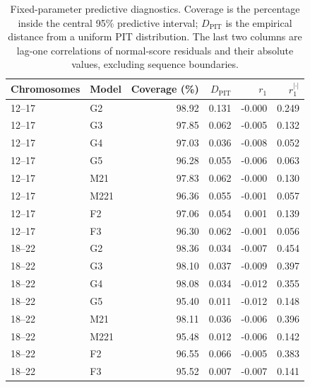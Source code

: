 \begin{table}[htbp]
\centering
\small
\caption{Fixed-parameter predictive diagnostics. Coverage is the percentage inside the central 95\% predictive interval; $D_{\mathrm{PIT}}$ is the empirical distance from a uniform PIT distribution. The last two columns are lag-one correlations of normal-score residuals and their absolute values, excluding sequence boundaries.}
\label{tab:si-genomic-calibration}
\begin{tabular}{llrrrr}
\toprule
Chromosomes & Model & Coverage (\%) & $D_{\mathrm{PIT}}$ & $r_1$ & $r_1^{|\cdot|}$ \\
\midrule
12--17 & G2 & 98.92 & 0.131 & -0.000 & 0.249 \\
12--17 & G3 & 97.85 & 0.062 & -0.005 & 0.132 \\
12--17 & G4 & 97.03 & 0.036 & -0.008 & 0.052 \\
12--17 & G5 & 96.28 & 0.055 & -0.006 & 0.063 \\
12--17 & M21 & 97.83 & 0.062 & -0.000 & 0.130 \\
12--17 & M221 & 96.36 & 0.055 & -0.001 & 0.057 \\
12--17 & F2 & 97.06 & 0.054 & 0.001 & 0.139 \\
12--17 & F3 & 96.30 & 0.062 & -0.001 & 0.056 \\
18--22 & G2 & 98.36 & 0.034 & -0.007 & 0.454 \\
18--22 & G3 & 98.10 & 0.037 & -0.009 & 0.397 \\
18--22 & G4 & 98.08 & 0.034 & -0.012 & 0.355 \\
18--22 & G5 & 95.40 & 0.011 & -0.012 & 0.148 \\
18--22 & M21 & 98.11 & 0.036 & -0.006 & 0.396 \\
18--22 & M221 & 95.48 & 0.012 & -0.006 & 0.142 \\
18--22 & F2 & 96.55 & 0.066 & -0.005 & 0.383 \\
18--22 & F3 & 95.52 & 0.007 & -0.007 & 0.141 \\
\bottomrule
\end{tabular}
\end{table}
